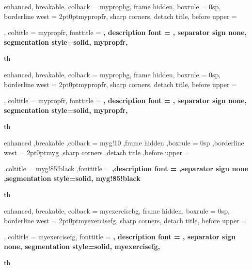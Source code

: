 
{%
    enhanced,
    breakable,
    colback = mypropbg,
    frame hidden,
    boxrule = 0sp,
    borderline west = {2pt}{0pt}{mypropfr},
    sharp corners,
    detach title,
    before upper = \tcbtitle\par\smallskip,
    coltitle = mypropfr,
    fonttitle = \bfseries\sffamily,
    description font = \mdseries,
    separator sign none,
    segmentation style={solid, mypropfr},
}
{th}

{%
    enhanced,
    breakable,
    colback = mypropbg,
    frame hidden,
    boxrule = 0sp,
    borderline west = {2pt}{0pt}{mypropfr},
    sharp corners,
    detach title,
    before upper = \tcbtitle\par\smallskip,
    coltitle = mypropfr,
    fonttitle = \bfseries\sffamily,
    description font = \mdseries,
    separator sign none,
    segmentation style={solid, mypropfr},
}
{th}



{%
    enhanced
    ,breakable
    ,colback = myg!10
    ,frame hidden
    ,boxrule = 0sp
    ,borderline west = {2pt}{0pt}{myg}
    ,sharp corners
    ,detach title
    ,before upper = \tcbtitle\par\smallskip
    ,coltitle = myg!85!black
    ,fonttitle = \bfseries\sffamily
    ,description font = \mdseries
    ,separator sign none
    ,segmentation style={solid, myg!85!black}
}
{th}




{%
    enhanced,
    breakable,
    colback = myexercisebg,
    frame hidden,
    boxrule = 0sp,
    borderline west = {2pt}{0pt}{myexercisefg},
    sharp corners,
    detach title,
    before upper = \tcbtitle\par\smallskip,
    coltitle = myexercisefg,
    fonttitle = \bfseries\sffamily,
    description font = \mdseries,
    separator sign none,
    segmentation style={solid, myexercisefg},
}
{th}

